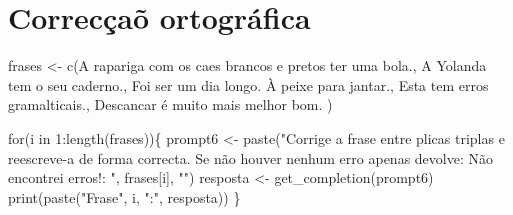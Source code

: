 \documentclass[
  letterpaper,
  paper=6in:9in,
  pagesize=pdftex,
  headinclude=on,
  footinclude=on,
  12pt]{scrbook}
\newenvironment{Shaded}{\begin{snugshade}}{\end{snugshade}}
\newcommand{\ControlFlowTok}[1]{\textcolor[rgb]{0.00,0.23,0.31}{#1}}
\newcommand{\DecValTok}[1]{\textcolor[rgb]{0.68,0.00,0.00}{#1}}
\newcommand{\FunctionTok}[1]{\textcolor[rgb]{0.28,0.35,0.67}{#1}}
\newcommand{\NormalTok}[1]{\textcolor[rgb]{0.00,0.23,0.31}{#1}}
\newcommand{\OtherTok}[1]{\textcolor[rgb]{0.00,0.23,0.31}{#1}}
\newcommand{\SpecialCharTok}[1]{\textcolor[rgb]{0.37,0.37,0.37}{#1}}
\newcommand{\StringTok}[1]{\textcolor[rgb]{0.13,0.47,0.30}{#1}}
\begin{document}
\hypertarget{correcuxe7auxf5-ortogruxe1fica}{%
\section{Correcçaõ ortográfica}\label{correcuxe7auxf5-ortogruxe1fica}}

\begin{Shaded}
\begin{Highlighting}[]
\NormalTok{frases }\OtherTok{\textless{}{-}} \FunctionTok{c}\NormalTok{(}\StringTok{\textquotesingle{}A rapariga com os caes brancos e pretos ter uma bola.\textquotesingle{}}\NormalTok{,}
            \StringTok{\textquotesingle{}A Yolanda tem o seu caderno.\textquotesingle{}}\NormalTok{,}
            \StringTok{\textquotesingle{}Foi ser um dia longo. À peixe para jantar.\textquotesingle{}}\NormalTok{,}
            \StringTok{\textquotesingle{}Esta tem erros gramalticais.\textquotesingle{}}\NormalTok{,}
            \StringTok{\textquotesingle{}Descancar é muito mais melhor bom.\textquotesingle{}}
\NormalTok{            )}

\ControlFlowTok{for}\NormalTok{(i }\ControlFlowTok{in} \DecValTok{1}\SpecialCharTok{:}\FunctionTok{length}\NormalTok{(frases))\{}
\NormalTok{  prompt6 }\OtherTok{\textless{}{-}} \FunctionTok{paste}\NormalTok{(}\StringTok{"Corrige a frase entre plicas triplas e reescreve{-}a de forma correcta. }
\StringTok{                 Se não houver nenhum erro apenas devolve: \textquotesingle{}Não encontrei erros!\textquotesingle{}: \textquotesingle{}\textquotesingle{}\textquotesingle{}"}\NormalTok{, frases[i], }\StringTok{"\textquotesingle{}\textquotesingle{}\textquotesingle{}"}\NormalTok{)}
\NormalTok{  resposta }\OtherTok{\textless{}{-}} \FunctionTok{get\_completion}\NormalTok{(prompt6)}
  \FunctionTok{print}\NormalTok{(}\FunctionTok{paste}\NormalTok{(}\StringTok{"Frase"}\NormalTok{, i, }\StringTok{":"}\NormalTok{, resposta))}
\NormalTok{\}}
\end{Highlighting}
\end{Shaded}
\end{document}
